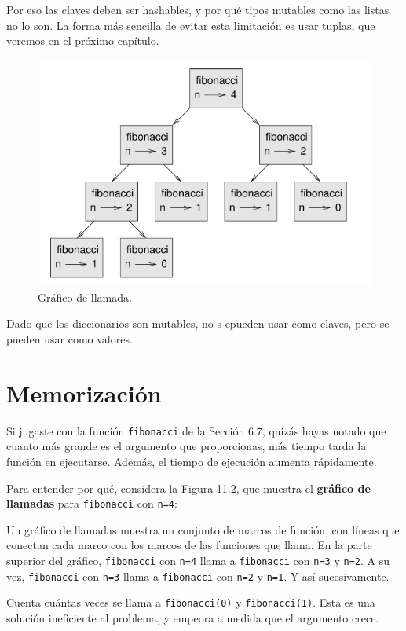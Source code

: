 Por eso las claves deben ser hashables, y por qué tipos mutables como las listas no lo son. La forma más sencilla de evitar esta limitación es usar tuplas, que veremos en el próximo capítulo.

\begin{figure}[h]
\centering
\includegraphics[width=0.7\linewidth]{images/chapter_11_2.png} %
\caption{Gráfico de llamada.}
\label{fig:diagrama_estado}
\end{figure}

Dado que los diccionarios son mutables, no s epueden usar como claves, pero se pueden usar como valores.

\section{Memorización}

Si jugaste con la función \texttt{fibonacci} de la Sección 6.7, quizás hayas notado que cuanto más grande es el argumento que proporcionas, más tiempo tarda la función en ejecutarse. Además, el tiempo de ejecución aumenta rápidamente.

Para entender por qué, considera la Figura 11.2, que muestra el \textbf{gráfico de llamadas} para \texttt{fibonacci} con \texttt{n=4}:

Un gráfico de llamadas muestra un conjunto de marcos de función, con líneas que conectan cada marco con los marcos de las funciones que llama. En la parte superior del gráfico, \texttt{fibonacci} con \texttt{n=4} llama a \texttt{fibonacci} con \texttt{n=3} y \texttt{n=2}. A su vez, \texttt{fibonacci} con \texttt{n=3} llama a \texttt{fibonacci} con \texttt{n=2} y \texttt{n=1}. Y así sucesivamente.

Cuenta cuántas veces se llama a \texttt{fibonacci(0)} y \texttt{fibonacci(1)}. Esta es una solución ineficiente al problema, y empeora a medida que el argumento crece.

